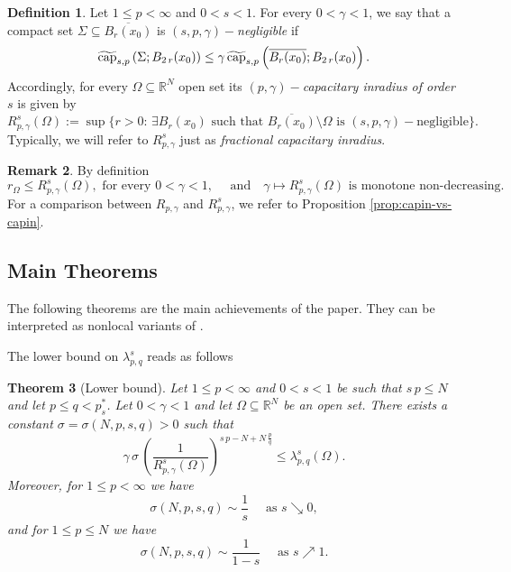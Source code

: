 \documentclass{amsart}
\newtheorem{theorem}{Theorem}[section]
\theoremstyle{definition}
\newtheorem{remark}[theorem]{Remark}
\newtheorem{definition}[theorem]{Definition}
\numberwithin{equation}{section}
\begin{document}
	\begin{definition}\label{def:inradius}
		Let $1 \le p < \infty$ and $0<s<1$. For every $0<\gamma<1$, we say that a compact set $\Sigma \subseteq \overline{B_r(x_0)}$ is $(s, p, \gamma)-$\emph{negligible} if
		\begin{equation*}
			\widetilde{{\rm cap}}_{s,p}\left(\Sigma; B_{2\,r}(x_0)\right) \le \gamma\,\widetilde{{\rm cap}}_{s,p}\left(\overline{B_r(x_0)}; B_{2\,r}(x_0)\right).
		\end{equation*}
		Accordingly, for every $\Omega \subseteq \mathbb{R}^N$ open set its {\it $(p,\gamma)-$capacitary inradius of order $s$} is given by 
		\begin{equation}
			R^s_{p,\gamma}(\Omega) := \sup \Big\{ r > 0 :\, \exists B_r(x_0) \mbox{ such that } \overline{B_r(x_0)} \setminus \Omega \mbox{ is } (s,p,\gamma)-\mbox{negligible} \Big\}.
		\end{equation}
		Typically, we will refer to $R^s_{p, \gamma}$ just as {\it fractional capacitary inradius}.  
	\end{definition}
	
	\begin{remark}
		By definition
		\[
		r_\Omega \le R^s_{p, \gamma}(\Omega), \mbox{ for every } 0 < \gamma < 1, \quad \mbox{ and} \quad \gamma \mapsto R^s_{p, \gamma}(\Omega) \mbox{ is monotone non-decreasing.}
		\]
		For a comparison between $R_{p,\gamma}$ and $R^s_{p, \gamma}$, we refer to Proposition \ref{prop:capin-vs-capin}. 
	\end{remark}
	\subsection{Main Theorems} The following theorems are the main achievements of the paper. They can be interpreted as nonlocal variants of \cite[Main Theorem \& Theorem 6.1]{BozBra2}. 
	\par 
	The lower bound on $\lambda_{p, q}^s$ reads as follows 
	
	\begin{theorem}[Lower bound]
		\label{thm:lower-bound}
		Let  $1 \le p < \infty$ and $0<s<1$ be such that $s\,p \le N$ and let $p \le q < p^*_s$.
		Let $0 < \gamma < 1$ and let $\Omega \subseteq \mathbb{R}^N$ be an open set. There exists a constant $\sigma = \sigma\left(N, p, s, q\right) > 0$ such that  
		\begin{equation} \label{main:lower-bound}
			\gamma\,\sigma\,\left(\frac{1}{R^s_{p, \gamma}(\Omega)}\right)^{s\,p-N+N\,\frac{p}{q}} \le \lambda_{p, q}^s(\Omega).
		\end{equation}
		Moreover, for $1 \le p < \infty$ we have 
		\[
		\sigma(N, p, s, q) \sim \frac{1}{s} \quad \mbox{ as } s \searrow 0, 
		\]
		and for $1 \le p \le N$ we have 
		\[
		\sigma(N, p, s, q) \sim \frac{1}{1-s} \quad \mbox{ as } s \nearrow 1. 
		\]
	\end{theorem}
	
\end{document}
